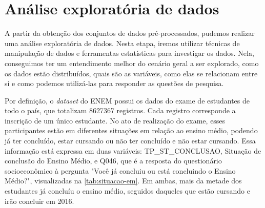 \section{Análise exploratória de dados}
\label{sec:eda}
A partir da obtenção dos conjuntos de dados pré-processados, pudemos realizar uma análise exploratória de dados. Nesta etapa, iremos utilizar técnicas de manipulação de dados e ferramentas estatísticas para investigar os dados. Nela, conseguimos ter um entendimento melhor do cenário geral a ser explorado, como os dados estão distribuídos, quais são as variáveis, como elas se relacionam entre si e como podemos utilizá-las para responder as questões de pesquisa.

Por definição, o \textit{dataset} do ENEM possui os dados do exame de estudantes de todo o país, que totalizam 8627367 registros. Cada registro corresponde a inscrição de um único estudante. No ato de realização do exame, esses participantes estão em diferentes situações em relação ao ensino médio, podendo já ter concluído, estar cursando ou não ter concluído e não estar cursando. Essa informação está expressa em duas variáveis: TP\_ST\_CONCLUSAO, Situação de conclusão do Ensino Médio, e Q046, que é a resposta do questionário socioeconômico à pergunta "Você já concluiu ou está concluindo o Ensino Médio?", visualizadas na \autoref{tab:situacao-em}. Em ambas, mais da metade dos estudantes já concluíu o ensino médio, seguidos daqueles que estão cursando e irão concluir em 2016.

